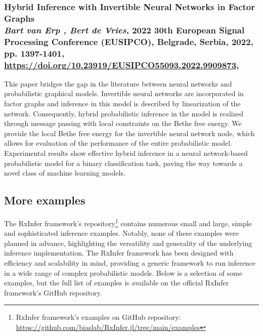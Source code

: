 \subsubsection*{Hybrid Inference with Invertible Neural Networks in Factor Graphs\\{\small \normalfont \textit{Bart van Erp , Bert de Vries}, 2022 30th European Signal Processing Conference (EUSIPCO), Belgrade, Serbia, 2022, pp. 1397-1401, \url{https://doi.org/10.23919/EUSIPCO55093.2022.9909873}, \citep{van_erp_hybrid_2022}}}

This paper bridges the gap in the literature between neural networks and probabilistic
graphical models.
Invertible neural networks are incorporated in factor graphs and inference in this model is
described by linearization of the network.
Consequently, hybrid probabilistic inference in the model is realized through message passing
with local constraints on the Bethe free energy.
We provide the local Bethe free energy for the invertible neural network node, which allows
for evaluation of the performance of the entire probabilistic model.
Experimental results show effective hybrid inference in a neural network-based probabilistic
model for a binary classification task, paving the way towards a novel class of machine
learning models.

\subsection*{More examples}

The RxInfer framework's repository\footnote{RxInfer framework's examples on GitHub repository:
  \url{https://github.com/biaslab/RxInfer.jl/tree/main/examples}} contains numerous small and
large, simple and sophisticated inference examples.
Notably, none of these examples were planned in advance, highlighting the versatility and
generality of the underlying inference implementation.
The RxInfer framework has been designed with efficiency and scalability in mind, providing a
generic framework to run inference in a wide range of complex probabilistic models.
Below is a selection of some examples, but the full list of examples is available on the
official RxInfer framework's GitHub repository.

